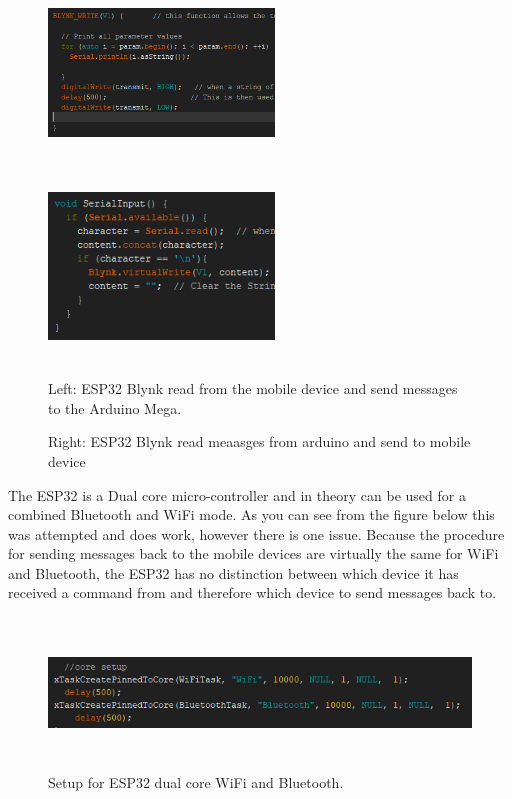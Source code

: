 \documentclass[8pt, a4paper]{article}
\begin{document}
\begin{figure}[H]
	\centering
	\includegraphics[height=5.0cm, width=6.0cm]{blynk1}
	\includegraphics[height=5.0cm, width=6.0cm]{blynk2}
	\caption{Left: ESP32 Blynk read from the mobile device and send messages to the Arduino Mega.}
	\caption{Right: ESP32 Blynk read meaasges from arduino and send to mobile device}
\end{figure}

The ESP32 is a Dual core micro-controller and in theory can be used for a combined Bluetooth and WiFi mode. As you can see from the figure below this was attempted and does work, however there is one issue. Because the procedure for sending messages back to the mobile devices are virtually the same for WiFi and Bluetooth, the ESP32 has no distinction between which device it has received a command from and therefore which device to send messages back to.

\begin{figure}[H]
	\centering
	\includegraphics[height=4.0cm, width=15.0cm]{multicore}
	\caption{Setup for ESP32 dual core WiFi and Bluetooth.}
\end{figure}
\end{document}
